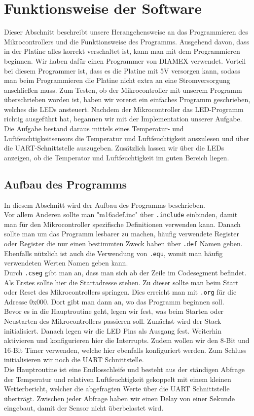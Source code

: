 \documentclass[]{article}
\begin{document}
\section{Funktionsweise der Software}
Dieser Abschnitt beschreibt unsere Herangehensweise an das Programmieren des Mikrocontrollers und die Funktionsweise des Programms. Ausgehend davon, dass in der Platine alles korrekt verschaltet ist, kann man mit dem Programmieren beginnen. Wir haben dafür einen Programmer von DIAMEX verwendet. Vorteil bei diesem Programmer ist, dass es die Platine mit 5V versorgen kann, sodass man beim Programmieren die Platine nicht extra an eine Stromversorgung anschließen muss. 
Zum Testen, ob der Mikrocontroller mit unserem Programm überschrieben worden ist, haben wir vorerst ein einfaches Programm geschrieben, welches die LEDs ansteuert. Nachdem der Mikrocontroller das LED-Programm richtig ausgeführt hat, begannen wir mit der Implementation unserer Aufgabe. Die Aufgabe bestand daraus mittels eines Temperatur- und Luftfeuchtigkeitsensors die Temperatur und Luftfeuchtigkeit auszulesen und über die UART-Schnittstelle auszugeben. Zusätzlich lassen wir über die LEDs anzeigen, ob die Temperator und Luftfeuchtigkeit im guten Bereich liegen. 

\subsection{Aufbau des Programms}
In diesem Abschnitt wird der Aufbau des Programms beschrieben.
\\Vor allem Anderen sollte man "m16adef.inc" über \texttt{.include} einbinden, damit man für den Mikrocontroller spezifische Definitionen verwenden kann. Danach sollte man um das Programm lesbarer zu machen, häufig verwendete Register oder Register die nur einen bestimmten Zweck haben über \texttt{.def} Namen geben. Ebenfalls nützlich ist auch die Verwendung von \texttt{.equ}, womit man häufig verwendeten Werten Namen geben kann.
\\Durch \texttt{.cseg} gibt man an, dass man sich ab der Zeile im Codesegment befindet. Als Erstes sollte hier die Startadresse stehen. Zu dieser sollte man beim Start oder Reset des Mikrocontrollers springen. Dies erreicht man mit \texttt{.org} für die Adresse 0x000. Dort gibt man dann an, wo das Programm beginnen soll.
\\Bevor es in die Hauptroutine geht, legen wir fest, was beim Starten oder Neustarten des Mikrocontrollers passieren soll. Zunächst wird der Stack initialisiert. Danach legen wir die LED Pins als Ausgang fest. Weiterhin aktivieren und konfigurieren hier die Interrupts. Zudem wollen wir den 8-Bit und 16-Bit Timer verwenden, welche hier ebenfalls konfiguriert werden. Zum Schluss initialisieren wir noch die UART Schnittstelle.
\\Die Hauptroutine ist eine Endlosschleife und besteht aus der ständigen Abfrage der Temperatur und relativen Luftfeuchtigkeit gekoppelt mit einem kleinen Wetterbericht, welcher die abgefragten Werte über die UART Schnittstelle überträgt. Zwischen jeder Abfrage haben wir einen Delay von einer Sekunde eingebaut, damit der Sensor nicht überbelastet wird.
\end{document}
